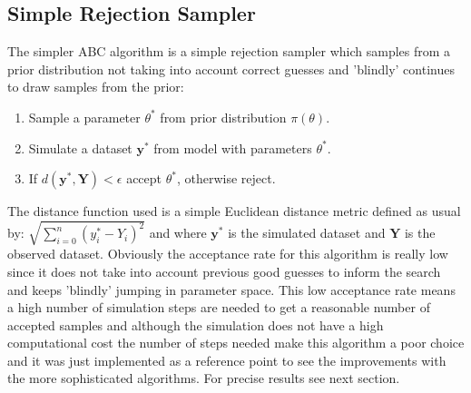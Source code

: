 \documentclass[12pt,a4paper,titlepage]{article}
\begin{document}
\subsection{Simple Rejection Sampler}
The simpler ABC algorithm is a simple rejection sampler\cite{pritchard1999population} which samples from a prior distribution not taking into account correct guesses and 'blindly' continues to draw samples from the prior:
\begin{enumerate}[noitemsep]
\item{Sample a parameter $\theta ^*$ from prior distribution $\pi(\theta)$.}
\item{Simulate a dataset $\mathbf{y}^*$  from model with parameters $\theta ^*$.}
\item{If $d(\mathbf{y}^*, \mathbf{Y}) < \epsilon$ accept $\theta^*$, otherwise reject.}
\end{enumerate}
The distance function used is a simple Euclidean distance metric defined as usual by: $\sqrt{\sum_{i=0}^{n} (y^*_{i} - Y_{i})^2}$ and where $\mathbf{y}^*$ is the simulated dataset and $\mathbf{Y}$ is the observed dataset. Obviously the acceptance rate for this algorithm is really low since it does not take into account previous good guesses to inform the search and keeps 'blindly' jumping in parameter space. This low acceptance rate means a high number of simulation steps are needed to get a reasonable number of accepted samples and although the simulation does not have a high computational cost the number of steps needed make this algorithm a poor choice and it was just implemented as a reference point to see the improvements with the more sophisticated algorithms. For precise results see next section.
\end{document}
